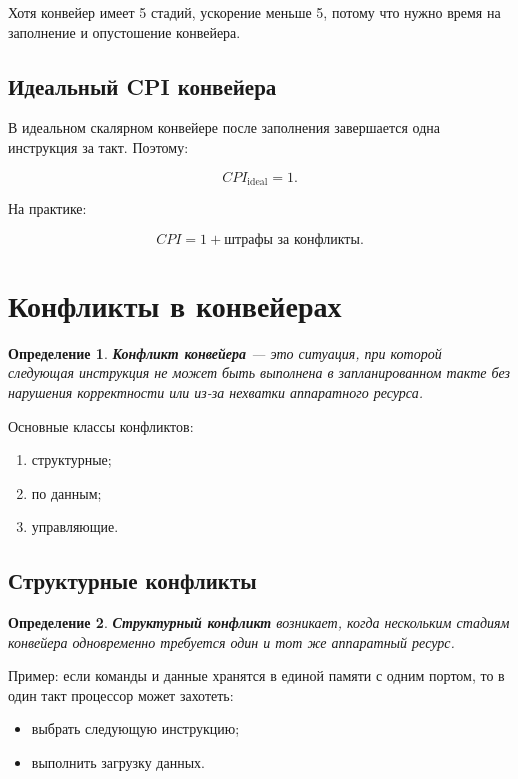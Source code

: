 \documentclass[12pt,a4paper]{article}
\newtheorem{definition}{Определение}
\begin{document}
Хотя конвейер имеет 5 стадий, ускорение меньше 5, потому что нужно время на заполнение и опустошение конвейера.

\subsection{Идеальный CPI конвейера}

В идеальном скалярном конвейере после заполнения завершается одна инструкция за такт. Поэтому:

\[
    CPI_{\text{ideal}} = 1.
\]

На практике:

\[
    CPI = 1 + \text{штрафы за конфликты}.
\]

\section{Конфликты в конвейерах}

\begin{definition}
\textbf{Конфликт конвейера} --- это ситуация, при которой следующая инструкция не может быть выполнена в запланированном такте без нарушения корректности или из-за нехватки аппаратного ресурса.
\end{definition}

Основные классы конфликтов:

\begin{enumerate}
    \item структурные;
    \item по данным;
    \item управляющие.
\end{enumerate}

\subsection{Структурные конфликты}

\begin{definition}
\textbf{Структурный конфликт} возникает, когда нескольким стадиям конвейера одновременно требуется один и тот же аппаратный ресурс.
\end{definition}

Пример: если команды и данные хранятся в единой памяти с одним портом, то в один такт процессор может захотеть:

\begin{itemize}
    \item выбрать следующую инструкцию;
    \item выполнить загрузку данных.
\end{itemize}
\end{document}
